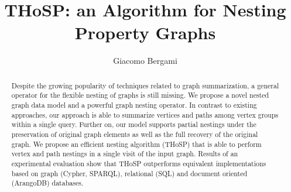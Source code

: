 


\begin{abstract}
  Despite the growing popularity of techniques related to graph summarization, a general operator for the flexible nesting of graphs is still missing.
  We propose a novel nested graph data model and a powerful graph nesting operator. In contrast to existing approaches, our approach is able to summarize vertices and paths among vertex groups within a single query. Further on, our model supports partial nestings under the preservation of original graph elements as well as the full recovery of the original graph. We propose an efficient nesting algorithm (THoSP) that is able to perform vertex and path nestings in a single visit of the input graph. Results of an experimental evaluation show that THoSP outperforms equivalent implementations based on graph (Cypher, SPARQL), relational (SQL) and document oriented (ArangoDB) databases.
\end{abstract}


\fancyhead{}
\title{THoSP: an Algorithm for Nesting Property Graphs}



\author{Giacomo Bergami}

